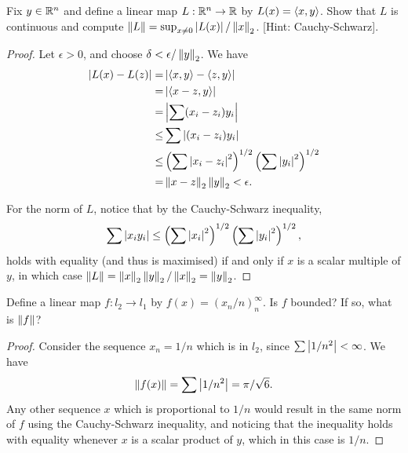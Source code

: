 \begin{exercise}{76}
Fix $y\in\mathbb{R}^n$ and define a linear map $L:\mathbb{R}^n\to\mathbb{R}$ by $L(x)=\langle x,y\rangle$.
Show that $L$ is continuous and compute $\left\lVert L\right\rVert = \sup_{x\neq 0}\left\lvert L(x)\right\rvert/\left\lVert x\right\rVert_2$.
[Hint: Cauchy-Schwarz].
\end{exercise}
\begin{proof}
Let $\epsilon>0$, and choose $\delta < \epsilon/\left\lVert y\right\rVert_2$.
We have 
\begin{align*}
    \left\lvert L(x)-L(z)\right\rvert 
    =& \left\lvert \langle x,y\rangle - \langle z,y\rangle\right\rvert\\
    =& \left\lvert \langle x-z,y\rangle\right\rvert\\
    =& \left\lvert \sum (x_i-z_i)y_i\right\rvert\\
    \leq& \sum\left\lvert (x_i-z_i)y_i\right\rvert\\
    \leq& \left( \sum\left\lvert x_i-z_i\right\rvert^2\right)^{1/2}\left( \sum\left\lvert y_i\right\rvert^2\right)^{1/2}\\
    =& \left\lVert x-z\right\rVert_2\left\lVert y\right\rVert_2 < \epsilon.
\end{align*}

For the norm of $L$, notice that by the Cauchy-Schwarz inequality, 
\begin{align*}
    \sum \left\lvert x_iy_i\right\rvert
    \leq \left( \sum \left\lvert x_i\right\rvert^2\right)^{1/2}\left( \sum \left\lvert y_i\right\rvert^2\right)^{1/2},
\end{align*}
holds with equality (and thus is maximised) if and only if $x$ is a scalar multiple of $y$, in which case $\left\lVert L\right\rVert = \left\lVert x\right\rVert_2\left\lVert y\right\rVert_2/\left\lVert x\right\rVert_2 = \left\lVert y\right\rVert_2$.
\end{proof} 

\begin{exercise}{78}
Define a linear map $f:l_2\to l_1$ by $f(x)=(x_n/n)_n^\infty$.
Is $f$ bounded?
If so, what is $\left\lVert f\right\rVert$?
\end{exercise}
\begin{proof}
Consider the sequence $x_n = 1/n$ which is in $l_2$, since $\sum\left\lvert 1/n^2\right\rvert<\infty$.
We have
\begin{align*}
    \left\lVert f(x)\right\rVert = \sum\left\lvert 1/n^2\right\rvert = \pi/\sqrt{6}.
\end{align*}
Any other sequence $x$ which is proportional to $1/n$ would result in the same norm of $f$ using the Cauchy-Schwarz inequality, and noticing that the inequality holds with equality whenever $x$ is a scalar product of $y$, which in this case is $1/n$.
\end{proof} 

